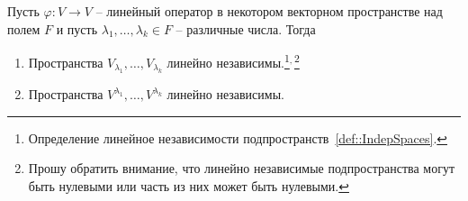 \begin{claim}\label{claim::EigenRootInd}
Пусть $\varphi\colon V\to V$ -- линейный оператор в некотором векторном пространстве над полем $F$ и пусть $\lambda_1,\ldots,\lambda_k\in F$ -- различные числа. Тогда
\begin{enumerate}
\item Пространства $V_{\lambda_1},\ldots,V_{\lambda_k}$ линейно независимы.\footnote{Определение линейное независимости подпространств~\ref{def::IndepSpaces}.}${}^{,\,}$\footnote{Прошу обратить внимание, что линейно независимые подпространства могут быть нулевыми или часть из них может быть нулевыми.}

\item Пространства $V^{\lambda_1},\ldots,V^{\lambda_k}$ линейно независимы.

\end{enumerate}
\end{claim}
